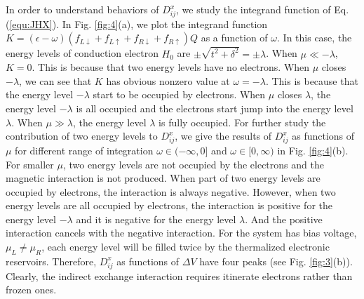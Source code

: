 \documentclass[aps,prb,twocolumn,showpacs,amssymb]{revtex4-1}
\begin{document}
In order to understand behaviors of $D^{x}_{ij}$, we study the integrand function of Eq. (\ref{equ:JHX}). In Fig. \ref{fig:4}(a), we plot the integrand function $K=(\epsilon-\omega)(f_{L{\downarrow}}+f_{L{\uparrow}}+f_{R{\downarrow}}+f_{R{\uparrow}})Q$ as a function of $\omega$. In this case, the energy levels of conduction electron $H_0$ are $\pm\sqrt{t^2+\delta^2}=\pm\lambda$.
When $\mu\ll-\lambda$, $K=0$. This is because that two energy levels have no electrons.
When $\mu$ closes $-\lambda$, we can see that $K$ has obvious nonzero value at $\omega=-\lambda$. This is because that the energy level $-\lambda$ start to be occupied by electrons.
When $\mu$ closes $\lambda$, the energy level $-\lambda$ is all occupied and the electrons start jump into the energy level $\lambda$.
When $\mu\gg\lambda$, the energy level $\lambda$ is fully occupied.
For further study the contribution of two energy levels to $D^{x}_{ij}$, we give the results of $D^{x}_{ij}$ as functions of $\mu$ for different range of integration $\omega\in(-\infty,0]$ and $\omega\in[0,\infty)$ in Fig. \ref{fig:4}(b).
For smaller $\mu$, two energy levels are not occupied by the electrons and the magnetic interaction is not produced. When part of two energy levels are occupied by electrons, the interaction is always negative. However, when two energy levels are all occupied by electrons, the interaction is positive for the energy level $-\lambda$ and it is negative for the energy level $\lambda$. And the positive interaction cancels with the negative interaction. For the system has bias voltage, $\mu_{L}\neq\mu_{R}$, each energy level will be filled twice by the thermalized electronic reservoirs. Therefore, $D^{x}_{ij}$ as functions of ${\Delta}V$ have four peaks (see Fig. \ref{fig:3}(b)).
Clearly, the indirect exchange interaction requires itinerate electrons rather than frozen ones.
\end{document}
